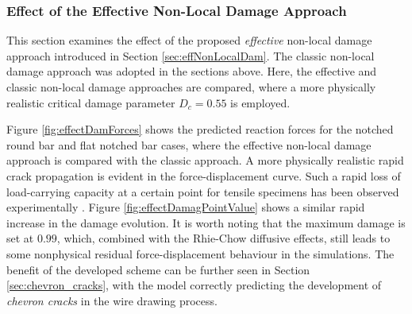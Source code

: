 \documentclass[sn-mathphys,Numbered]{sn-jnl}%
\begin{document}
\subsubsection{Effect of the Effective Non-Local Damage Approach} \label{sec:effectiveNonLocalDamResults}
This section examines the effect of the proposed \emph{effective} non-local damage approach introduced in Section \ref{sec:effNonLocalDam}.
The classic non-local damage approach was adopted in the sections above.
Here, the effective and classic non-local damage approaches are compared, where a more physically realistic critical damage parameter $D_c = 0.55$ is employed.

Figure \ref{fig:effectDamForces} shows the predicted reaction forces for the notched round bar and flat notched bar cases, where the effective non-local damage approach is compared with the classic approach.
A more physically realistic rapid crack propagation is evident in the force-displacement curve.
Such a rapid loss of load-carrying capacity at a certain point for tensile specimens has been observed experimentally \citep{li_ductile_2011, malcher_improved_2014}.
Figure \ref{fig:effectDamagPointValue} shows a similar rapid increase in the damage evolution.
It is worth noting that the maximum damage is set at $0.99$, which, combined with the Rhie-Chow diffusive effects, still leads to some nonphysical residual force-displacement behaviour in the simulations.
The benefit of the developed scheme can be further seen in Section \ref{sec:chevron_cracks}, with the model correctly predicting the development of \emph{chevron cracks} in the wire drawing process.
\end{document}
